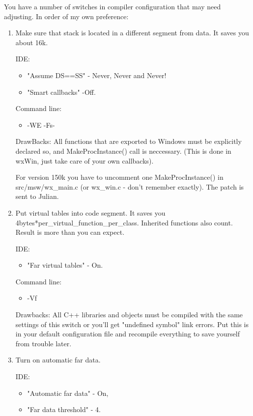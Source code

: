 You have a number of switches in compiler configuration that may need
adjusting. In order of my own preference:

\begin{enumerate}
\item Make sure that stack is located in a different segment from data.
     It saves you about 16k.

IDE:
\begin{itemize}
\item "Assume DS==SS" - Never, Never and Never! 
\item "Smart callbacks" -Off.
\end{itemize}

Command line:
\begin{itemize}
\item -WE -Fs-
\end{itemize}

DrawBacks: All functions that are exported to Windows must be 
explicitly declared so, and MakeProcInstance() call is neccessary.
(This is done in wxWin, just take care of your own callbacks).

For version 150k you have to uncomment one MakeProcInstance() in
src/msw/wx\_main.c (or wx\_win.c - don't remember exactly). 
The patch is sent to Julian.
   
\item Put virtual tables into code segment.
It saves you 4bytes*per\_virtual\_function\_per\_class. Inherited functions
also count. Result is more than you can expect. 

IDE:
\begin{itemize}
\item "Far virtual tables" - On.
\end{itemize}

Command line: 
\begin{itemize}
\item -Vf
\end{itemize}

Drawbacks: All C++ libraries and objects must be compiled with the
same settings of this switch or you'll get "undefined symbol" link
errors. Put this is in your default configuration file and 
recompile everything to save yourself from trouble later.
\item Turn on automatic far data.

IDE:
\begin{itemize}
\item "Automatic far data" - On,
\item "Far data threshold" - 4.
\end{itemize}


\end{enumerate}
